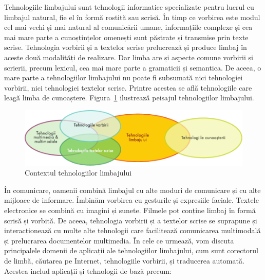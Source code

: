 \documentclass[]{../../metanetpaper}
\begin{document}
\clearpage

\begin{multicols}{2}

Tehnologiile limbajului sunt tehnologii informatice specializate pentru lucrul cu limbajul natural, fie el în formă rostită sau scrisă. În timp ce vorbirea este modul cel mai vechi și mai natural al comunicării umane, informațiile complexe și cea mai mare parte a cunoștințelor omenești sunt păstrate și transmise prin texte scrise. Tehnologia vorbirii și a textelor scrise prelucrează și produce limbaj în aceste două modalități de realizare. Dar limba are și aspecte comune vorbirii și scrierii, precum lexicul, cea mai mare parte a gramaticii și semantica. De aceea, o mare parte a tehnologiilor limbajului nu poate fi subsumată nici tehnologiei vorbirii, nici tehnologiei textelor scrise. Printre acestea se află tehnologiile care leagă limba de cunoaștere. Figura~\ref{fig:ltincontext_de} ilustrează peisajul tehnologiilor limbajului.

\begin{figure}[htb]
\center
\includegraphics[width=\textwidth]{../_media/romanian/language_technologies}
\caption{Contextul tehnologiilor limbajului}
\label{fig:ltincontext_de}
\end{figure}

În comunicare, oamenii combină limbajul cu alte moduri de comunicare și cu alte mijloace de informare. Îmbinăm vorbirea cu gesturile și expresiile faciale. Textele electronice se combină cu imagini și sunete. Filmele pot conține limbaj în formă scrisă și vorbită. De aceea, tehnologia vorbirii și a textelor scrise se suprapune și interacționează cu multe alte tehnologii care facilitează comunicarea multimodală și prelucrarea documentelor multimedia.
În cele ce urmează, vom discuta principalele domenii de aplicații ale tehnologiilor limbajului, cum sunt corectorul de limbă, căutarea pe Internet, tehnologiile vorbirii, și traducerea automată. Acestea includ aplicații și tehnologii de bază precum:


\end{multicols}
\end{document}
